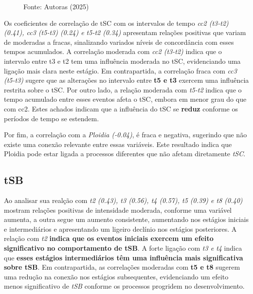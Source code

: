 \begin{figure}[h]
\begin{minipage}[b]{0.45\linewidth}
        \vspace{0.3cm}
        \begin{minipage}{\linewidth}
            \centering
            \scriptsize{Fonte: Autoras (2025)}
        \end{minipage}
    \end{minipage}
\end{figure}
\FloatBarrier

Os coeficientes de correlação de tSC com os intervalos de tempo \textit{cc2 (t3-t2) (0.41), cc3 (t5-t3) (0.24) e t5-t2 (0.34)} apresentam relações positivas que variam de moderadas a fracas, sinalizando variados níveis de concordância com esses tempos acumulados. A correlação moderada com \textit{cc2 (t3-t2)} indica que o intervalo entre t3 e t2 tem uma influência moderada no tSC, evidenciando uma ligação mais clara neste estágio. Em contrapartida, a correlação fraca com \textit{cc3 (t5-t3)} sugere que as alterações no intervalo entre \textbf{t5 e t3} exercem uma influência restrita sobre o tSC. Por outro lado, a relação moderada com \textit{t5-t2} indica que o tempo acumulado entre esses eventos afeta o tSC, embora em menor grau do que com cc2. Estes achados indicam que a influência do tSC se \textbf{reduz} conforme os períodos de tempo se estendem.

Por fim, a correlação com a \textit{Ploidia (-0.04)}, é fraca e negativa, sugerindo que não existe uma conexão relevante entre essas variáveis. Este resultado indica que Ploidia pode estar ligada a processos diferentes que não afetam diretamente \textit{tSC}.

\subsection*{tSB}
Ao analisar sua realção com \textit{t2 (0.43), t3 (0.56), t4 (0.57), t5 (0.39) e t8 (0.40)} mostram relações positivas de intensidade moderada, conforme uma variável aumenta, a outra segue um aumento consistente, aumentando nos estágios iniciais e intermediários e apresentando um ligeiro declínio nos estágios posteriores. A relação com \textit{t2} \textbf{indica que os eventos iniciais exercem um efeito significativo no comportamento de \textbf{tSB}}. A forte ligação com \textit{t3 e t4} indica que \textbf{esses estágios intermediários têm uma influência mais significativa sobre \textbf{tSB}}. Em contrapartida, as correlações moderadas com \textbf{t5 e t8} sugerem uma redução na conexão nos estágios subsequentes, evidenciando um efeito menos significativo de \textit{tSB} conforme os processos progridem no desenvolvimento.

